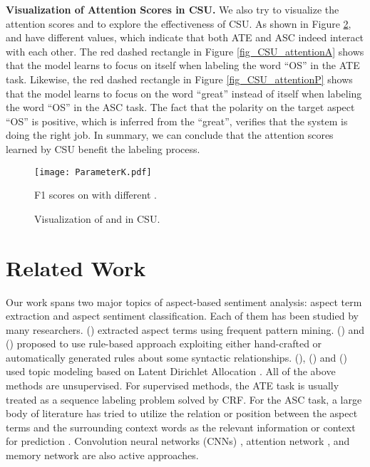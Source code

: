 \documentclass[11pt,a4paper]{article}
\begin{document}
	\vspace{+1mm}
	\noindent
	\textbf{Visualization of Attention Scores in CSU.} \quad We also try to visualize the attention scores  and  to explore the effectiveness of CSU. As shown in Figure \ref{fig_CSU_attention},  and  have different values, which indicate that both ATE and ASC indeed interact with each other. The red dashed rectangle in Figure \ref{fig_CSU_attentionA} shows that the model learns to focus on itself when labeling the word ``OS'' in the ATE task. Likewise, the red dashed rectangle in Figure \ref{fig_CSU_attentionP} shows that the model learns to focus on the word ``great'' instead of itself when labeling the word ``OS'' in the ASC task. The fact that the polarity on the target aspect ``OS'' is positive, which is inferred from the ``great'', verifies that the system is doing the right job. In summary, we can conclude that the attention scores learned by CSU benefit the labeling process.
	\begin{figure}[tp]
		\centering
		\texttt{[image: ParameterK.pdf]}
		\caption{F1 scores on  with different .}
		\label{fig_parameter_k}
	\end{figure}
	\begin{figure}[htbp]
		\centering
		\caption{Visualization of  and  in CSU.}
		\label{fig_CSU_attention}
	\end{figure}

\section{Related Work}
	\label{sec_related_work}
	Our work spans two major topics of aspect-based sentiment analysis: aspect term extraction and aspect sentiment classification. Each of them has been studied by many researchers. \citeauthor{Hu2004} (\citeyear{Hu2004}) extracted aspect terms using frequent pattern mining. \citeauthor{Qiu2011} (\citeyear{Qiu2011}) and \citeauthor{Liu2015Automated} (\citeyear{Liu2015Automated}) proposed to use rule-based approach exploiting either hand-crafted or automatically generated rules about some syntactic relationships. \citeauthor{Mei2007} (\citeyear{Mei2007}), \citeauthor{He2011auto} (\citeyear{He2011auto}) and \citeauthor{Chen2014Aspect} (\citeyear{Chen2014Aspect}) used topic modeling based on Latent Dirichlet Allocation \cite{Blei2003}. All of the above methods are unsupervised. For supervised methods, the ATE task is usually treated as a sequence labeling problem solved by CRF. For the ASC task, a large body of literature has tried to utilize the relation or position between the aspect terms and the surrounding context words as the relevant information or context for prediction \cite{Tang2016a,Arjun2016extract}. Convolution neural networks (CNNs) \cite{Poria2016aspect,Li2018}, attention network \cite{Wang2016attention,Ma2017a,He2017}, and memory network \cite{Wang2018a} are also active approaches.
	
\end{document}
